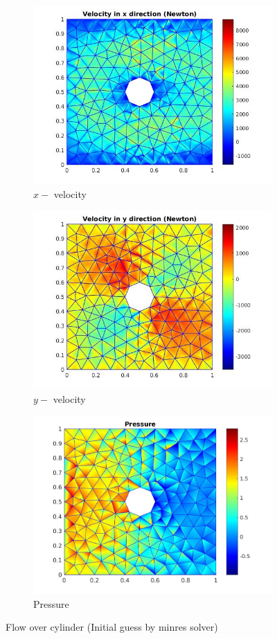 \documentclass[a4paper,openany]{book}
\begin{document}
\begin{figure}
  \begin{subfigure}{\textwidth}
    \includegraphics[width=0.8\linewidth]{cylinder_newton_vx_minres.jpg}
    \caption{$x-$ velocity}
  \label{x_vel_navier_stoke_minres}
  \end{subfigure}
  \begin{subfigure}{\textwidth}
    \includegraphics[width=0.8\linewidth]{cylinder_newton_vy_minres.jpg}
    \caption{$y-$ velocity}
  \label{y_vel_navier_stoke_minres}
  \end{subfigure}
  \begin{subfigure}{\textwidth}
    \includegraphics[width=0.8\linewidth]{cylinder_newton_pressure_minres.jpg}
    \caption{Pressure}
  \label{pressure_navier_stoke_minres}
  \end{subfigure}
\caption{Flow over cylinder (Initial guess by minres solver)}
\label{flow_over_cylinder_minres_n_s}
\end{figure}
\end{document}
